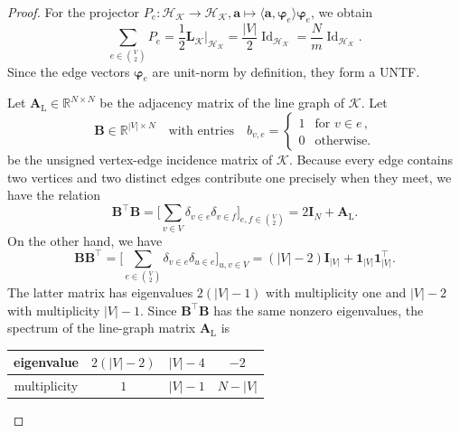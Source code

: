 \documentclass[a4paper]{amsart}
\numberwithin{equation}{section}
\DeclareMathOperator{\Id}{Id}
\begin{document}
\begin{proof}
    For the projector $P_e\colon\mathcal H_{\mathcal K}\to\mathcal H_{\mathcal K}, \bm a\mapsto \langle\bm a,\bm\varphi_e\rangle\bm\varphi_e$, we obtain
    \begin{equation*}
        \sum_{e\in\binom V2}P_e
        =\frac12\bm L_{\mathcal K}\big|_{\mathcal H_{\mathcal K}}
        =\frac {|V|}2\Id_{\mathcal H_{\mathcal K}}
        =\frac Nm\Id_{\mathcal H_{\mathcal K}}.
    \end{equation*}
    Since the edge vectors $\bm\varphi_e$ are unit-norm by definition, they form a UNTF.

    Let $\bm A_{\mathrm L} \in\mathds R^{N\times N}$ be the adjacency matrix of the line graph of $\mathcal K$.
    Let
    \begin{equation*}
        \bm B\in\mathds R^{|V|\times N}
        \quad\text{with entries}\quad
        b_{v,e} = \begin{cases}1 & \text{for } v\in e\,,\\0& \text{otherwise.}\end{cases}
    \end{equation*}
    be the unsigned vertex-edge incidence matrix of $\mathcal K$.
    Because every edge contains two vertices and two distinct edges contribute one precisely when they meet, we have the relation
    \begin{equation*}
        \bm B^\top\bm B
        = \Big[ \sum_{v\in V} \delta_{v\in e}\delta_{v\in f} \Big]_{e,f\in \binom{V}{2}}
        = 2\bm I_N+\bm A_{\mathrm L} .
    \end{equation*}
    On the other hand, we have
    \begin{equation*}
        \bm B\bm B^\top
        = \Big[ \sum_{e\in\binom{V}{2}} \delta_{v\in e}\delta_{u\in e} \Big]_{u,v\in V}
        = (|V|-2)\bm I_{|V|}+\bm 1_{|V|}\bm 1_{|V|}^\top .
    \end{equation*}
    The latter matrix has eigenvalues $2(|V|-1)$ with multiplicity one and $|V|-2$ with multiplicity $|V|-1$.
    Since $\bm B^\top\bm B$ has the same nonzero eigenvalues, the spectrum of the line-graph matrix $\bm A_{\mathrm L}$ is
    \begin{center}
    \begin{tabular}{c|ccc}
        eigenvalue & $2(|V|-2)$ & $|V|-4$ & $-2$ \\
        \hline
        multiplicity & $1$ & $|V|-1$ & $N-|V|$
    \end{tabular}
    \end{center}


\end{proof}
\end{document}
